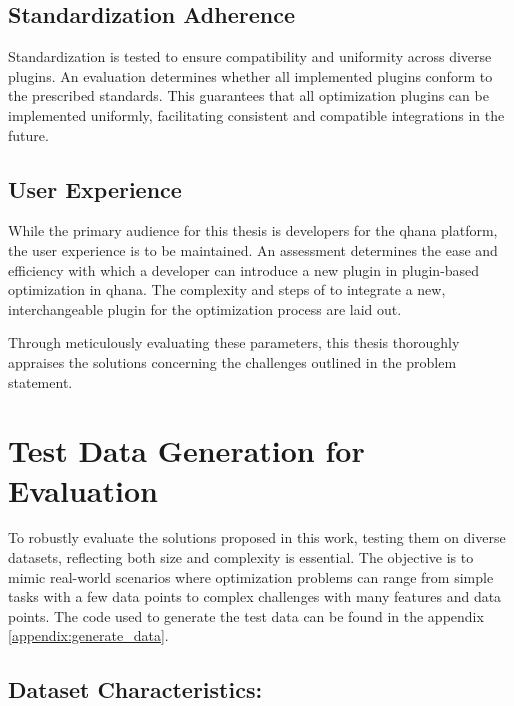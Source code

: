 \documentclass[
  a4paper,  %
  twoside,  %
  bibliography=totoc,
  headsepline,
  cleardoublepage=empty,
  parskip=half,
  draft=false
]{scrbook}
\begin{document}
\subsection{Standardization Adherence}
Standardization is tested to ensure compatibility and uniformity across diverse plugins.
An evaluation determines whether all implemented plugins conform to the prescribed standards.
This guarantees that all optimization plugins can be implemented uniformly, facilitating consistent and compatible integrations in the future.

\subsection{User Experience}
While the primary audience for this thesis is developers for the \gls{qhana} platform, the user experience is to be maintained.
An assessment determines the ease and efficiency with which a developer can introduce a new plugin in plugin-based optimization in \gls{qhana}.
The complexity and steps of to integrate a new, interchangeable plugin for the optimization process are laid out.

Through meticulously evaluating these parameters, this thesis thoroughly appraises the solutions concerning the challenges outlined in the problem statement.

\section{Test Data Generation for Evaluation}
To robustly evaluate the solutions proposed in this work, testing them on diverse datasets, reflecting both size and complexity is essential.
The objective is to mimic real-world scenarios where optimization problems can range from simple tasks with a few data points to complex challenges with many features and data points.
The code used to generate the test data can be found in the appendix \ref{appendix:generate_data}.

\subsection{Dataset Characteristics:}
\end{document}
